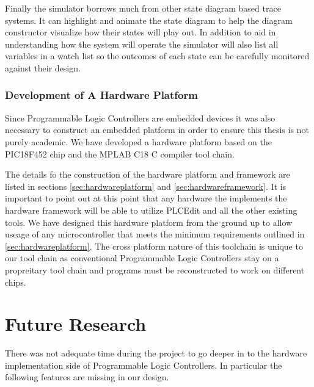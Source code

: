 Finally the simulator borrows much from other state diagram based trace systems. It can highlight and animate the state diagram to help the diagram constructor visualize how their states will play out. In addition to aid in understanding how the system will operate the simulator will also list all variables in a watch list so the outcomes of each state can be carefully monitored against their design.

\subsubsection{Development of A Hardware Platform}
Since Programmable Logic Controllers are embedded devices it was also necessary to construct an embedded platform in order to ensure this thesis is not purely academic. We have developed a hardware platform based on the PIC18F452 chip and the MPLAB C18 C compiler tool chain.

The details fo the construction of the hardware platform and framework are listed in sections \ref{sec:hardwareplatform} and \ref{sec:hardwareframework}. It is important to point out at this point that any hardware the implements the hardware framework will be able to utilize PLCEdit and all the other existing tools. We have designed this hardware platform from the ground up to allow useage of any microcontroller that meets the minimum requirements outlined in \ref{sec:hardwareplatform}. The cross platform nature of this toolchain is unique to our tool chain as conventional Programmable Logic Controllers stay on a propreitary tool chain and programs must be reconstructed to work on different chips.


\section{Future Research}
There was not adequate time during the project to go deeper in to the hardware implementation side of Programmable Logic Controllers. In particular the following features are missing in our design.

